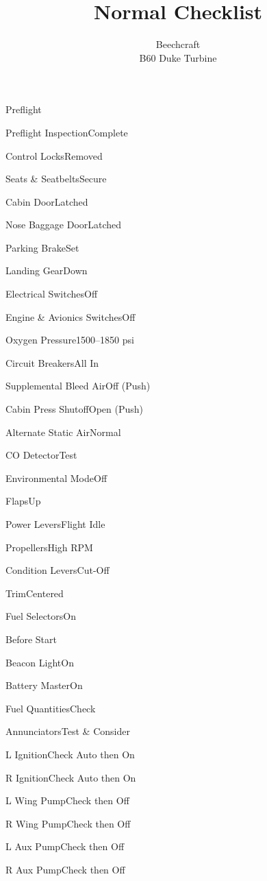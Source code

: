 \documentclass[sim-use]{checklist}
\title{Normal Checklist}
\subtitle{Beechcraft \\ B60 Duke Turbine}
\begin{document}
\begin{checklist}{Preflight}
  \item{Preflight Inspection}{Complete}
  \item{Control Locks}{Removed}
  \item{Seats \& Seatbelts}{Secure}
  \item{Cabin Door}{Latched}
  \item{Nose Baggage Door}{Latched}
  \item{Parking Brake}{Set}
  \item{Landing Gear}{Down}
  \item{Electrical Switches}{Off}
  \item{Engine \& Avionics Switches}{Off}
  \item{Oxygen Pressure}{1500--1850 psi}
  \item{Circuit Breakers}{All In}
  \item{Supplemental Bleed Air}{Off (Push)}
  \item{Cabin Press Shutoff}{Open (Push)}
  \item{Alternate Static Air}{Normal}
  \item{CO Detector}{Test}
  \item{Environmental Mode}{Off}
  \item{Flaps}{Up}
  \item{Power Levers}{Flight Idle}
  \item{Propellers}{High RPM}
  \item{Condition Levers}{Cut-Off}
  \item{Trim}{Centered}
  \item{Fuel Selectors}{On}
\end{checklist}
  
\begin{checklist}{Before Start}
  \item{Beacon Light}{On}
  \item{Battery Master}{On}
  \item{Fuel Quantities}{Check}
  \item{Annunciators}{Test \& Consider}
  \item{L Ignition}{Check Auto then On}
  \item{R Ignition}{Check Auto then On}
\end{checklist}
\begin{checklist}{}
  \item{L Wing Pump}{Check then Off}
  \item{R Wing Pump}{Check then Off}
  \item{L Aux Pump}{Check then Off}
  \item{R Aux Pump}{Check then Off}
\end{checklist}
  
\end{document}
